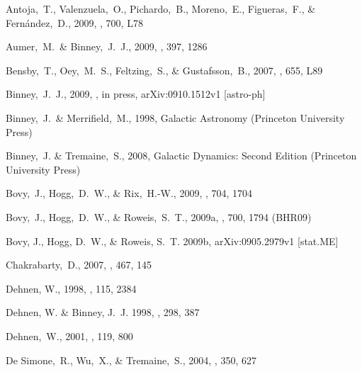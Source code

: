 \documentclass[12pt,preprint]{aastex}
\newcommand{\etal}{et~al.}
\newcommand{\bhr}{BHR09}
\begin{document}
\begin{thebibliography}{}

\bibitem[Antoja \etal(2009)]{Antoja09a}
  Antoja,~T., Valenzuela,~O., Pichardo,~B., Moreno,~E., Figueras,~F., \& Fern{\'a}ndez,~D., 2009,
  \apjl, 700, L78

  Aumer,~M.~\& Binney,~J.~J., 2009,
  \mnras, 397, 1286

\bibitem[Bensby \etal(2007)]{Bensby07a}
  Bensby,~T., Oey,~M.~S., Feltzing,~S., \& Gustafsson,~B., 2007,
  \apjl, 655, L89

  Binney,~J.~J., 2009, \mnras, in press, arXiv:0910.1512v1 [astro-ph]

  Binney,~J.~\& Merrifield,~M., 1998,
  {Galactic Astronomy} (Princeton University Press)

{Binney},~J. \& {Tremaine},~S., 2008, {Galactic Dynamics: Second Edition}
  (Princeton University Press)

  Bovy,~J., Hogg,~D.~W., \& Rix,~H.-W., 2009,
  \apj, 704, 1704

 Bovy,~J., Hogg,~D.~W.,
  \& Roweis,~S.~T., 2009a, \apj, 700, 1794 (\bhr)

{Bovy}, J., {Hogg}, D.~W., \& {Roweis}, S.~T. 2009b, {arXiv:0905.2979v1
[stat.ME]}

  Chakrabarty,~D., 2007,
  \aap, 467, 145

{Dehnen}, W., 1998, \aj, 115, 2384

{Dehnen}, W. \& {Binney}, J.~J. 1998, \mnras, 298, 387

  Dehnen,~W., 2001,
  \aj, 119, 800


  De Simone,~R., Wu,~X., \& Tremaine,~S., 2004,
  \mnras, 350, 627


\end{thebibliography}
\end{document}
